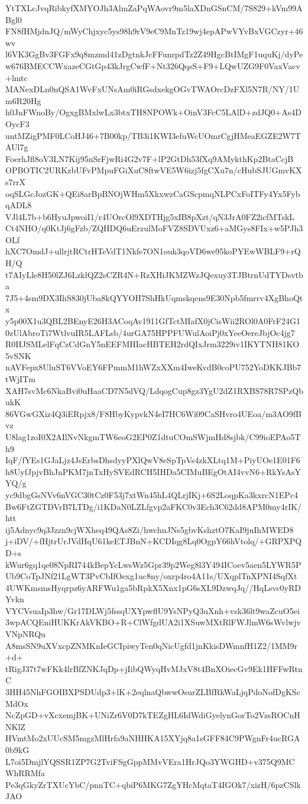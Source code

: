 YtTXLcJvqRibkyfXMYOJh3AlmZaPqWAovr9m5laXDnGSnCM/7S829+kVm99ABgl0
FN8fHMjdnJQ/mWyChjxyc5ys98h9rV9eC9MnTz19wj4epAPwVYvBxVGCzyr+46wv
l6VK3GgBv3FGFx9q8mzmd41zDgtnkJcFFunrpdTz2Z49HgcBtIMgF1uquKj/dyPe
w676BMECCWxazeCGtGp43kJrgCwfF+Nt326QqsS+F9+LQwUZG9F0VaxVacv+lmtc
MANexDLn0nQSA1WvFxUNsAm0iRGsdxekgOGvTWAOrcDzFXl5N7R/NY/1Um6R20Hg
h0JnFWnoBy/OgxgBMxlwLx3btxTH8NPOWk+OinV3FcC5LAlD+zdJQ0+As4DOycF3
untMZigPMF0LCoHJ46+7B00kp/TB3i1KWI3efuWcUOmrCgjHMeaEGZE2W7TAUl7g
FoerhJfl8oV3LN7Kij95nSrFjwRi4G2v7F+lP2GtDh53fXq9AMykthKp2BtaCcjB
OPBOTIC2URKzbUFvPMpuFGiXuC8ftwVE5W6izj5fgCXu7n/cHubSJUGmvKXs7rrX
oqSLGcJozGK+QEi8arBpBNOjWHm5XkxwzCaGScpmqNLPCxFoITFy4Yx5FybqADL8
VJl4L7b+b6HyuJpwoiI1/r4UOrcOl9XDTHjg5xIB8pXzt/qN3JrA0FZ2icfMTskL
Ct4NHO/q0KtJj6gFzb/ZQHDQ6uErzulMoFVZ8SDVUxz6+aMGys8FIx+w5PJh3OLf
hXC7OmdJ+ullrjtRCtrHTeVdT1Nkfe7ON1ouk3qoVD6we95koPYEwWBLF9+rQH/Q
t7AIyLle8H50lZJ6LzklQZ2sCZR4N+RzXHiJKMZWzJQexuy3TJBtrnUdTYDsvtba
7J5+4sm9DX3IhS830jUba8kQYYOH7ShHkUqmskqens9E30Npb5fmrrv4XgBhoQtx
y5p00X1u3QBL2BEnyE26H3ACoqAv1911GfTctMIafX0jCisWii2ROl0A0FrF24G1
0zUlAbroTi7WtlvuIR5LAFLsb/4urGA75HPPFUWulAoiPj0xYeeOereJbjOc4jg7
R0HJSMLelFqCzCdGnY5nEEFMHIacHBTEH2rdQIxJrm3229iv1IKYTNH81KO5vSNK
nAVFepx8UluST6VVoEY6FPmmM1hWZxXXm4IweKvdB0coPU752YoDKKJBb7tWjITm
XAH7svMc6NkaBvi0uHaaCD7N5dVQ/LdqogCup8gz3YgU2dZ1RXBS78R7SPzQbukK
86VGwGXiz4Q3iERpjx8/F8HbyKypvkN4eI7HC6Wi09CaSHvro4UEoa/m3AO9fBvz
U8lag1zoI0X2AIlNvNkgmTW6eoG2EP0Z1dtuCOmSWjmHd8sjbk/C99ioEPAo5Th9
IqF/fYEs1GJaLjz4JsErbsDhsdyyPXlQwV8eSpTpVs4zkXLtq1M+PiyUOe1E01F6
h8UyfJpjvBhJnPKM7jnTxHySVEdRCH5IHDa5CIMuBEgOtAI4vvN6+RkYsAsYYQ/g
yc9dbgGsNVv6nVGC30tCz0F53j7xtWn45hL4QLrjIKj+6S2LoqpKa3kxrcN1EPc4
Bw6FtZGTDVrB7LTDg/i1KDaN0LZLfgvp2aFKC0v3Ech3C62dd8APM0my4rIK/htt
ij5Adnyc9q3Jzzn9cjWXheq49QAs8Zi/hwchnJNs5gbvKshztO7KaI9juIhMWED8
j+iDV/+fHjtrUrJVdHqU61keETJBnN+KCDIqg8Lq0OgpY66hVtolq/+GRPXPQD+s
kWur6gq1qe08NpRI744kBepYcLwsWz5Gpr39p2Weg8l3Y494ICoev5aen5LYWR5P
Ub9CoTpJNf21LgWT3PvCbIfOexg1uc8ny/oxrp4ro4A11s/UXqplTnXPNI4SqfXt
4UWKmsmsHyqrpz6yARFWu1ga5bRpkX5Xnx1pG6sXL9DzwqJq//HqLsvc0yRDYvkn
VYCVsuaIp3hw/Gr17DLWj5fssqUXYpwflU9YsNPyQ3uXnh+vsk36lt9waZcuO5ei
3wpACQEniHUKKrAkVKBO+R+ClWfgdUA2i1XSuwMXtRlFWJlmW6sWvlwjvVNpNRQu
A8msSN9uXVxcpZNMKnIeGCIpiwyTen0qNicUgfd1jnKkisDWmnfH1Z2/1MM9r+d+
tRigJ37t7wFKk4lrBfZNKJqDp+jIibQWyqHvMJxV8t4BnXOiecGv9Ek1HFFwRtnC
3HH45NhFGOIBXPSDUdp3+lK+2eqlnaQbwwOsurZLBfRkWaLjqPdoNofDgKScMdOx
NcZpGD+vXcxemjBK+UNiZr6V0D7kTEZgHL6IdWdiGyelynGorTo2VzsROCnHNKlZ
HVmtMo2xUUcSM5mgzMlHrfa9aNHHKA15XYjq8a1sGFF84C9PWgnFr4ucRGA0b9kG
L7oi5DmjlYQSSR1ZP7G2TviFSgGppMMvVEra1HrJQo3YWGHD+v375Q9MCWhRRMfa
Pe3qGkyZrTXUcYbC/pnnTC+qbiP6MKG7ZgYHcMqtaT4IGOk7/xizH/6pzCSlkJAO
